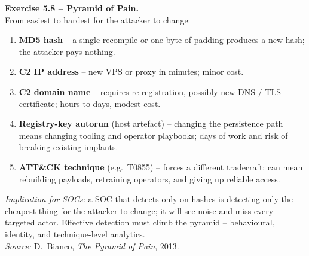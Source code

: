 \documentclass[11pt,a4paper]{article}
\begin{document}
\begin{solutionbox}
\textbf{Exercise 5.8 -- Pyramid of Pain.}\\
From easiest to hardest for the attacker to change:
\begin{enumerate}\setlength{\itemsep}{0pt}
  \item \textbf{MD5 hash} -- a single recompile or one byte of padding produces a new
        hash; the attacker pays nothing.
  \item \textbf{C2 IP address} -- new VPS or proxy in minutes; minor cost.
  \item \textbf{C2 domain name} -- requires re-registration, possibly new DNS / TLS
        certificate; hours to days, modest cost.
  \item \textbf{Registry-key autorun} (host artefact) -- changing the persistence path
        means changing tooling and operator playbooks; days of work and risk of breaking
        existing implants.
  \item \textbf{ATT\&CK technique} (e.g.\ T0855) -- forces a different tradecraft; can
        mean rebuilding payloads, retraining operators, and giving up reliable access.
\end{enumerate}
\emph{Implication for SOCs:} a SOC that detects only on hashes is detecting only the cheapest
thing for the attacker to change; it will see noise and miss every targeted actor. Effective
detection must climb the pyramid -- behavioural, identity, and technique-level analytics.\\[2pt]
\emph{Source:} D.\ Bianco, \emph{The Pyramid of Pain}, 2013.
\end{solutionbox}
\end{document}
